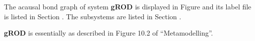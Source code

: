 
%

   The acausal bond graph of system \textbf{gROD} is
   displayed in Figure  and its label
   file is listed in Section .
   The subsystems are listed in Section .

{\bf gROD} is essentially as described in Figure 10.2 of
``Metamodelling''.
